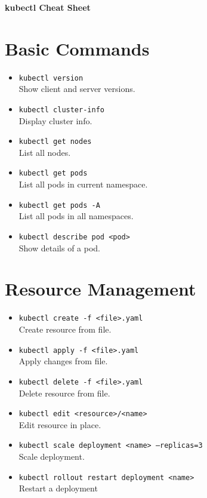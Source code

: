 \documentclass[a4paper,landscape]{article}
\begin{document}
\begin{center}
    {\LARGE \textbf{kubectl Cheat Sheet}}
\end{center}

\begin{multicols}{3}
\section*{Basic Commands}
\begin{itemize}
    \item \texttt{kubectl version} \\
    Show client and server versions.
    \item \texttt{kubectl cluster-info} \\
    Display cluster info.
    \item \texttt{kubectl get nodes} \\
    List all nodes.
    \item \texttt{kubectl get pods} \\
    List all pods in current namespace.
    \item \texttt{kubectl get pods -A} \\
    List all pods in all namespaces.
    \item \texttt{kubectl describe pod <pod>} \\
    Show details of a pod.
\end{itemize}

\section*{Resource Management}
\begin{itemize}
    \item \texttt{kubectl create -f <file>.yaml} \\
    Create resource from file.
    \item \texttt{kubectl apply -f <file>.yaml} \\
    Apply changes from file.
    \item \texttt{kubectl delete -f <file>.yaml} \\
    Delete resource from file.
    \item \texttt{kubectl edit <resource>/<name>} \\
    Edit resource in place.
    \item \texttt{kubectl scale deployment <name> --replicas=3} \\
    Scale deployment.
    \item \texttt{kubectl rollout restart deployment <name>} \\
    Restart a deployment
\end{itemize}


\end{multicols}
\end{document}
